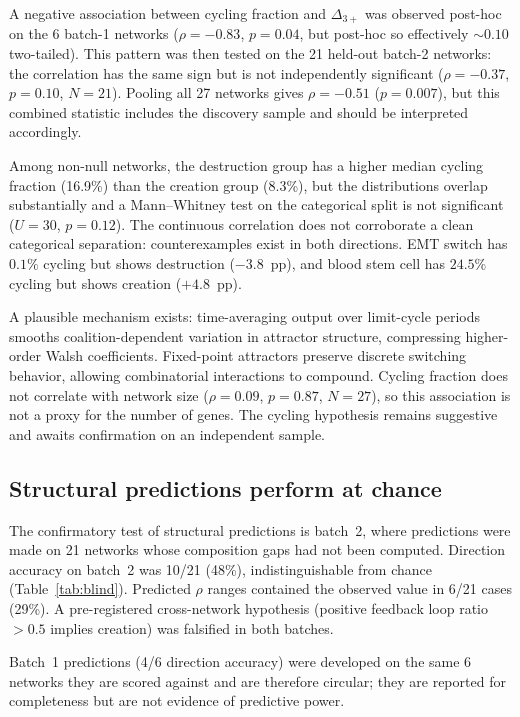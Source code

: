 \documentclass[11pt]{article}
\begin{document}
A negative association between cycling fraction and $\Delta_{3+}$ was
observed post-hoc on the 6 batch-1 networks ($\rho = -0.83$,
$p = 0.04$, but post-hoc so effectively $\sim 0.10$ two-tailed).
This pattern was then tested on the 21 held-out batch-2 networks:
the correlation has the same sign but is not independently
significant ($\rho = -0.37$, $p = 0.10$, $N = 21$). Pooling all 27
networks gives $\rho = -0.51$ ($p = 0.007$), but this combined
statistic includes the discovery sample and should be interpreted
accordingly.

Among non-null networks, the destruction group has a higher median
cycling fraction (16.9\%) than the creation group (8.3\%), but the
distributions overlap substantially and a Mann--Whitney test on the
categorical split is not significant ($U = 30$, $p = 0.12$). The
continuous correlation does not corroborate a clean categorical
separation: counterexamples exist in both directions. EMT switch has
$0.1\%$ cycling but shows destruction ($-3.8$~pp), and blood stem
cell has $24.5\%$ cycling but shows creation ($+4.8$~pp).

A plausible mechanism exists: time-averaging output over limit-cycle
periods smooths coalition-dependent variation in attractor structure,
compressing higher-order Walsh coefficients. Fixed-point attractors
preserve discrete switching behavior, allowing combinatorial
interactions to compound. Cycling fraction does not correlate with
network size ($\rho = 0.09$, $p = 0.87$, $N = 27$), so this
association is not a proxy for the number of genes. The cycling
hypothesis remains suggestive and awaits confirmation on an
independent sample.


\subsection{Structural predictions perform at chance}
\label{sec:blind-results}

The confirmatory test of structural predictions is batch~2, where
predictions were made on 21 networks whose composition gaps had not
been computed. Direction accuracy on batch~2 was 10/21 (48\%),
indistinguishable from chance (Table~\ref{tab:blind}). Predicted
$\rho$ ranges contained the observed value in 6/21 cases (29\%). A
pre-registered cross-network hypothesis (positive feedback loop ratio
$> 0.5$ implies creation) was falsified in both batches.

Batch~1 predictions (4/6 direction accuracy) were developed on the
same 6 networks they are scored against and are therefore circular;
they are reported for completeness but are not evidence of predictive
power.
\end{document}

